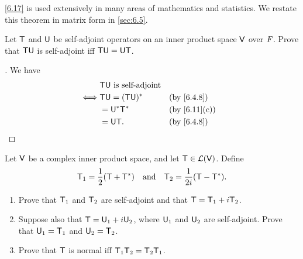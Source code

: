 \begin{note}
  \cref{6.17} is used extensively in many areas of mathematics and statistics.
  We restate this theorem in matrix form in \cref{sec:6.5}.
\end{note}

\exercisesection

\setcounter{ex}{3}
\begin{ex}\label{ex:6.4.4}
  Let \(\mathsf{T}\) and \(\mathsf{U}\) be self-adjoint operators on an inner product space \(\mathsf{V}\) over \(\mathit{F}\).
  Prove that \(\mathsf{T} \mathsf{U}\) is self-adjoint iff \(\mathsf{T} \mathsf{U} = \mathsf{U} \mathsf{T}\).
\end{ex}

\begin{proof}[]
  We have
  \begin{align*}
         & \T \U \text{ is self-adjoint}                                 \\
    \iff & \T \U = (\T \U)^*             &  & \text{(by \cref{6.4.8})}   \\
         & = \U^* \T^*                   &  & \text{(by \cref{6.11}(c))} \\
         & = \U \T.                      &  & \text{(by \cref{6.4.8})}
  \end{align*}
\end{proof}

\setcounter{ex}{5}
\begin{ex}\label{ex:6.4.6}
  Let \(\mathsf{V}\) be a complex inner product space, and let \(\mathsf{T} \in \mathcal{L}(\mathsf{V})\).
  Define
  \[
    \mathsf{T}_1 = \frac{1}{2} (\mathsf{T} + \mathsf{T}^*) \quad \text{and} \quad \mathsf{T}_2 = \frac{1}{2i} (\mathsf{T} - \mathsf{T}^*).
  \]
  \begin{enumerate}
    \item Prove that \(\mathsf{T}_1\) and \(\mathsf{T}_2\) are self-adjoint and that \(\mathsf{T} = \mathsf{T}_1 + i \mathsf{T}_2\).
    \item Suppose also that \(\mathsf{T} = \mathsf{U}_1 + i \mathsf{U}_2\), where \(\mathsf{U}_1\) and \(\mathsf{U}_2\) are self-adjoint.
          Prove that \(\mathsf{U}_1 = \mathsf{T}_1\) and \(\mathsf{U}_2 = \mathsf{T}_2\).
    \item Prove that \(\mathsf{T}\) is normal iff \(\mathsf{T}_1 \mathsf{T}_2 =  \mathsf{T}_2 \mathsf{T}_1\).
  \end{enumerate}
\end{ex}

